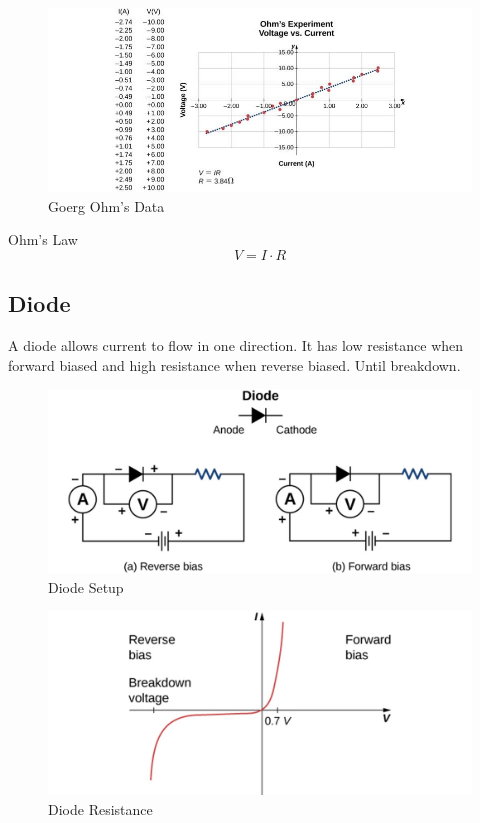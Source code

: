 \documentclass[14pt]{memoir}
\begin{document}
\begin{figure}[H]
\begin{center}
\includegraphics[scale=0.50]{fig/fig_09_20.jpg}
\caption{Goerg Ohm's Data}
\label{fig:09_20}
\end{center}
\end{figure}

Ohm's Law
\begin{equation}
V = I \cdot R
\end{equation}

\subsection{Diode}

A diode allows current to flow in one direction. It has low resistance when forward biased and high resistance when reverse biased. Until breakdown.

\begin{figure}[H]
\begin{center}
\includegraphics[scale=0.50]{fig/fig_09_21.jpg}
\caption{Diode Setup}
\label{fig:09_21}
\end{center}
\end{figure}

\begin{figure}[H]
\begin{center}
\includegraphics[scale=0.50]{fig/fig_09_22.jpg}
\caption{Diode Resistance}
\label{fig:09_22}
\end{center}
\end{figure}
\end{document}
